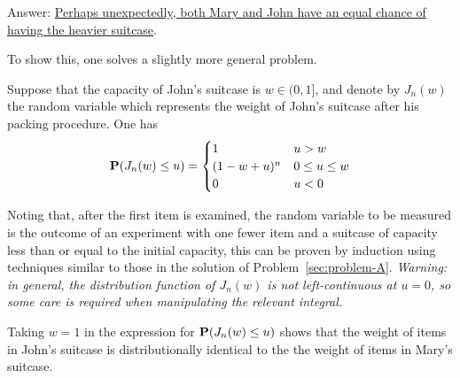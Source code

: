 \documentclass[british,a4paper]{article}
\begin{document}
Answer: \uline{Perhaps unexpectedly, both Mary and John have an equal chance of having the heavier suitcase}.

To show this, one solves a slightly more general problem.

Suppose that the capacity of John's suitcase is \(w \in (0, 1]\), and denote by \(J_n(w)\) the random variable which represents the weight of John's suitcase after his packing procedure. One has
\[
\operatorname{\mathbf{P}}(J_n(w) \leq u) =
\begin{cases}
1 & u > w\\
(1 - w + u)^n & 0 \leq u \leq w\\
0 & u < 0
\end{cases}
\]

Noting that, after the first item is examined, the random variable to be measured is the outcome of an experiment with one fewer item and a suitcase of capacity less than or equal to the initial capacity, this can be proven by induction using techniques similar to those in the solution of Problem~\ref{sec:problem-A}. \emph{Warning: in general, the distribution function of \(J_n(w)\) is not left-continuous at \(u = 0\), so some care is required when manipulating the relevant integral.}

Taking \(w = 1\) in the expression for \(\operatorname{\mathbf{P}}(J_n(w) \leq u)\) shows that the weight of items in John's suitcase is distributionally identical to the the weight of items in Mary's suitcase.
\end{document}
